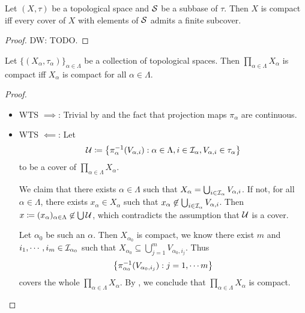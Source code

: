 \documentclass[screen]{techreport}
\numberwithin{equation}{section}
\newcommand{\diw}[1]{{\color{Red} DW: #1}}
\begin{document}
\begin{lemma}\label{Lem:CompactIffCompactWRTSubbase}
	Let $(X,\tau)$ be a topological space and $\mathcal{S}$ be a subbase of $\tau$.
	Then $X$ is compact iff every cover of $X$ with elements of $\mathcal{S}$ admits a finite subcover.
\end{lemma}
\begin{proof}
	\diw{TODO.}
\end{proof}

\begin{theorem}\label{The:Tikhonov}
	Let $\{(X_\alpha,\tau_\alpha)\}_{\alpha \in \Lambda}$ be a collection of topological spaces.
	Then $\prod_{\alpha \in \Lambda} X_\alpha$ is compact iff $X_\alpha$ is compact for all $\alpha \in \Lambda$.
\end{theorem}
\begin{proof}\
	\begin{itemize}
		\item WTS $\implies$: Trivial by  and the fact that projection maps $\pi_\alpha$ are continuous.
		\item WTS $\impliedby$: Let
		\[
		\mathcal{U} \coloneqq \left\{ { \pi_\alpha^{-1}(V_{\alpha,i}) : \alpha \in \Lambda, i \in \mathcal{I}_\alpha, V_{\alpha,i} \in \tau_\alpha  } \right\}
		\]
		to be a cover of $\prod_{\alpha \in \Lambda} X_\alpha$.
		
		We claim that there exists $\alpha \in \Lambda$ such that $X_\alpha = \bigcup_{i \in \mathcal{I}_\alpha} V_{\alpha,i}$.
		If not, for all $\alpha \in \Lambda$, there exists $x_\alpha \in X_\alpha$ such that $x_\alpha \not\in \bigcup_{i \in \mathcal{I}_\alpha} V_{\alpha,i}$.
		Then $x \coloneqq (x_\alpha)_{\alpha \in \Lambda} \not\in \bigcup \mathcal{U}$, which contradicts the assumption that $\mathcal{U}$ is a cover.
		
		Let $\alpha_0$ be such an $\alpha$.
		Then $X_{\alpha_0}$ is compact, we know there exist $m$ and $i_1,\cdots,i_m \in \mathcal{I}_{\alpha_0}$ such that $X_{\alpha_0} \subseteq \bigcup_{j=1}^m V_{\alpha_0,i_j}$.
		Thus
		\[
		\left\{ { \pi_{\alpha_0}^{-1}(V_{\alpha_0, i_j}) : j = 1,\cdots m } \right\}
		\]
		covers the whole $\prod_{\alpha \in \Lambda} X_\alpha$.
		By , we conclude that $\prod_{\alpha \in \Lambda} X_\alpha$ is compact.
	\end{itemize}
\end{proof}
\end{document}
